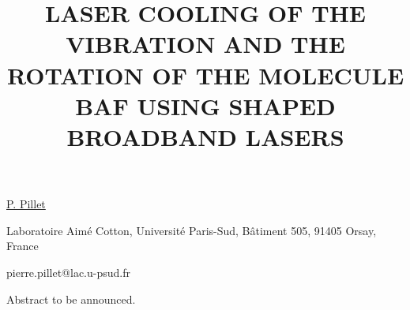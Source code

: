 \title{LASER COOLING OF THE VIBRATION AND THE ROTATION OF THE MOLECULE BAF USING SHAPED BROADBAND LASERS}

\underline{P. Pillet} 

{\normalsize{\vspace{-4mm}
Laboratoire Aim\'e Cotton, Universit\'e Paris-Sud, B\^atiment 505, 91405 Orsay, France

\email pierre.pillet@lac.u-psud.fr}}

Abstract to be announced.

\vspace{\baselineskip}
